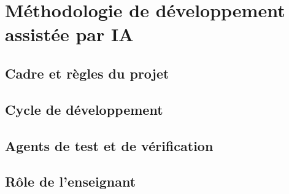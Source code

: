 
\chapter{Méthodologie de développement assistée par IA}\label{chap:methodologie}

\section{Cadre et règles du projet}

\section{Cycle de développement}

\section{Agents de test et de vérification}

\section{Rôle de l'enseignant}
